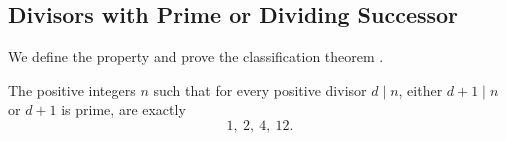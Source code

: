 
\subsection{Divisors with Prime or Dividing Successor}

We define the property
 and prove the
classification theorem
.

\begin{theorem}
The positive integers \(n\) such that for every positive divisor \(d\mid n\),
either \(d+1\mid n\) or \(d+1\) is prime, are exactly
\[
  1,\ 2,\ 4,\ 12.
\]
\end{theorem}

